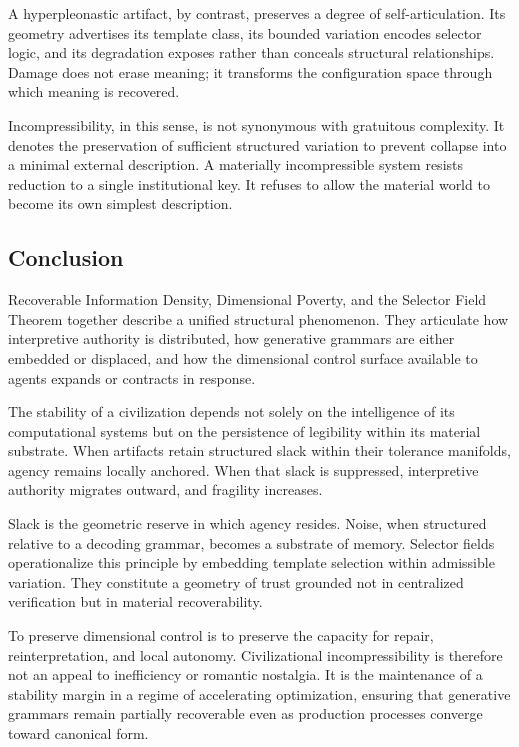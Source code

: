 \documentclass[11pt]{article}
\begin{document}
A hyperpleonastic artifact, by contrast, preserves a degree of
self-articulation. Its geometry advertises its template class, its
bounded variation encodes selector logic, and its degradation exposes
rather than conceals structural relationships. Damage does not erase
meaning; it transforms the configuration space through which meaning is
recovered.

Incompressibility, in this sense, is not synonymous with gratuitous
complexity. It denotes the preservation of sufficient structured
variation to prevent collapse into a minimal external description.
A materially incompressible system resists reduction to a single
institutional key. It refuses to allow the material world to become
its own simplest description.

\subsection{Conclusion}

Recoverable Information Density, Dimensional Poverty, and the Selector
Field Theorem together describe a unified structural phenomenon. They
articulate how interpretive authority is distributed, how generative
grammars are either embedded or displaced, and how the dimensional
control surface available to agents expands or contracts in response.

The stability of a civilization depends not solely on the intelligence
of its computational systems but on the persistence of legibility within
its material substrate. When artifacts retain structured slack within
their tolerance manifolds, agency remains locally anchored. When that
slack is suppressed, interpretive authority migrates outward, and
fragility increases.

Slack is the geometric reserve in which agency resides. Noise, when
structured relative to a decoding grammar, becomes a substrate of
memory. Selector fields operationalize this principle by embedding
template selection within admissible variation. They constitute a
geometry of trust grounded not in centralized verification but in
material recoverability.

To preserve dimensional control is to preserve the capacity for repair,
reinterpretation, and local autonomy. Civilizational incompressibility
is therefore not an appeal to inefficiency or romantic nostalgia. It is
the maintenance of a stability margin in a regime of accelerating
optimization, ensuring that generative grammars remain partially
recoverable even as production processes converge toward canonical form.
\end{document}
